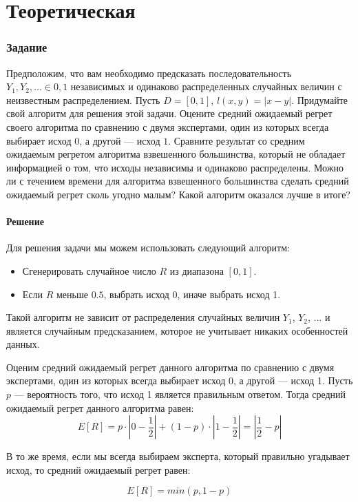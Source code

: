 \documentclass[a4paper,14pt]{extarticle}
\begin{document}
\newpage

\part{Теоретическая}
\section{Задание }

Предположим, что вам необходимо предсказать последовательность $Y_1, Y_2, \ldots \in {0, 1}$ независимых и одинаково распределенных случайных величин с неизвестным распределением. Пусть $D = [0, 1]$, $l(x, y) = |x - y|$. Придумайте свой алгоритм для решения этой задачи. Оцените средний ожидаемый регрет своего алгоритма по сравнению с двумя экспертами, один из которых всегда выбирает исход $0$, а другой — исход $1$. Сравните результат со средним ожидаемым регретом алгоритма взвешенного большинства, который не обладает информацией о том, что исходы независимы и одинаково распределены. Можно ли с течением времени для алгоритма взвешенного большинства сделать средний ожидаемый регрет сколь угодно малым? Какой алгоритм оказался лучше в итоге?

\subsection{Решение}

Для решения задачи мы можем использовать следующий алгоритм:
\begin{itemize}
\item Сгенерировать случайное число $R$ из диапазона $[0,1]$.
\item Если $R$ меньше $0.5$, выбрать исход 0, иначе выбрать исход 1.
\end{itemize}

Такой алгоритм не зависит от распределения случайных величин $Y_1$, $Y_2$, ... и является случайным предсказанием, которое не учитывает никаких особенностей данных.

Оценим средний ожидаемый регрет данного алгоритма по сравнению с двумя экспертами, один из которых всегда выбирает исход 0, а другой — исход 1. Пусть $p$ — вероятность того, что исход 1 является правильным ответом. Тогда средний ожидаемый регрет данного алгоритма равен:
$$ E\left[R\right] = p \cdot \left|0 - \frac{1}{2}\right| + \left(1 - p\right) \cdot \left|1 - \frac{1}{2}\right| = \left|\frac{1}{2} - p\right| $$

В то же время, если мы всегда выбираем эксперта, который правильно угадывает исход, то средний ожидаемый регрет равен:

$$ E[R] = min\left(p, 1 - p\right)$$
\end{document}
